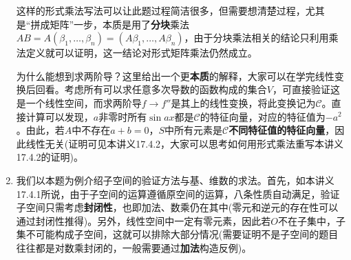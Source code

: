 \documentclass[a4paper,UTF8,fontset=windows,AutoFakeBold]{ctexart}
\newcommand*{\mc}{\mathcal{C}}
\newcommand*{\note}{\noindent *}
\begin{document}
\begin{enumerate}
    \note 这样的形式乘法写法可以让此题过程简洁很多，但需要想清楚过程，尤其是``拼成矩阵''一步，本质是用了\textbf{分块}乘法$AB=A(\beta_1,\dots,\beta_n)=(A\beta_1,\dots,A\beta_n)$，由于分块乘法相关的结论只利用乘法定义就可以证明，这一结论对形式矩阵乘法仍然成立。

    \note 为什么能想到求两阶导？这里给出一个更\textbf{本质}的解释，大家可以在学完线性变换后回看。考虑所有可以求任意多次导数的函数构成的集合$V$，可直接验证这是一个线性空间，而求两阶导$f\to f''$是其上的线性变换，将此变换记为$\mc$。直接计算可以发现，$a$非零时所有$\sin ax$都是$\mc$的特征向量，对应的特征值为$-a^2$。由此，若$A$中不存在$a+b=0$，$S$中所有元素是$\mc$\textbf{不同特征值的特征向量}，因此线性无关(证明可见本讲义17.4.2，大家可以思考如何用形式乘法重写本讲义17.4.2的证明)。

    \item 我们以本题为例介绍子空间的验证方法与基、维数的求法。首先，如本讲义17.4.1所说，由于子空间的运算遵循原空间的运算，八条性质自动满足，验证子空间只需考虑\textbf{封闭性}，也即加法、数乘仍在其中(零元和逆元的存在性可以通过封闭性推得)。另外，线性空间中一定有零元素，因此若$O$不在子集中，子集不可能构成子空间，这就可以排除大部分情况(需要证明不是子空间的题目往往都是对数乘封闭的，一般需要通过\textbf{加法}构造反例)。
    

\end{enumerate}
\end{document}
